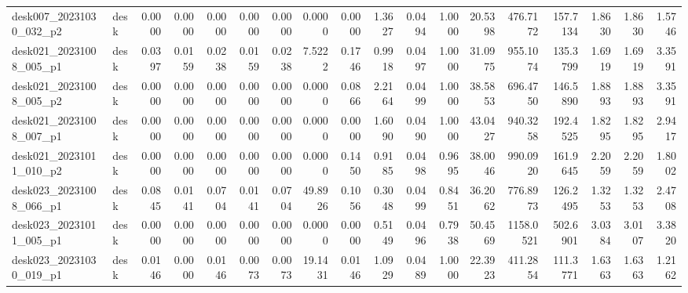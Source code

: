 \begin{table}[t]
{\begin{tabular}{l l r r r r r r r r r r r r r r r r }
desk007\_20231030\_032\_p2 & desk & 0.0000 & 0.0000 & 0.0000 & 0.0000 & 0.0000 & 0.0000 & 0.0000 & 1.3627 & 0.0494 & 1.0000 & 20.5398 & 476.7172 & 157.7134 & 1.8630 & 1.8630 & 1.5746 \\
desk021\_20231008\_005\_p1 & desk & 0.0397 & 0.0159 & 0.0238 & 0.0159 & 0.0238 & 7.5222 & 0.1746 & 0.9918 & 0.0497 & 1.0000 & 31.0975 & 955.1074 & 135.3799 & 1.6919 & 1.6919 & 3.3591 \\
desk021\_20231008\_005\_p2 & desk & 0.0000 & 0.0000 & 0.0000 & 0.0000 & 0.0000 & 0.0000 & 0.0866 & 2.2164 & 0.0499 & 1.0000 & 38.5853 & 696.4750 & 146.5890 & 1.8893 & 1.8893 & 3.3591 \\
desk021\_20231008\_007\_p1 & desk & 0.0000 & 0.0000 & 0.0000 & 0.0000 & 0.0000 & 0.0000 & 0.0000 & 1.6090 & 0.0490 & 1.0000 & 43.0427 & 940.3258 & 192.4525 & 1.8295 & 1.8295 & 2.9417 \\
desk021\_20231011\_010\_p2 & desk & 0.0000 & 0.0000 & 0.0000 & 0.0000 & 0.0000 & 0.0000 & 0.1450 & 0.9185 & 0.0498 & 0.9695 & 38.0046 & 990.0920 & 161.9645 & 2.2059 & 2.2059 & 1.8002 \\
desk023\_20231008\_066\_p1 & desk & 0.0845 & 0.0141 & 0.0704 & 0.0141 & 0.0704 & 49.8926 & 0.1056 & 0.3048 & 0.0499 & 0.8451 & 36.2062 & 776.8973 & 126.2495 & 1.3253 & 1.3253 & 2.4708 \\
desk023\_20231011\_005\_p1 & desk & 0.0000 & 0.0000 & 0.0000 & 0.0000 & 0.0000 & 0.0000 & 0.0000 & 0.5149 & 0.0496 & 0.7938 & 50.4569 & 1158.0521 & 502.6901 & 3.0384 & 3.0107 & 3.3820 \\
desk023\_20231030\_019\_p1 & desk & 0.0146 & 0.0000 & 0.0146 & 0.0073 & 0.0073 & 19.1431 & 0.0146 & 1.0929 & 0.0489 & 1.0000 & 22.3923 & 411.2854 & 111.3771 & 1.6363 & 1.6363 & 1.2162 \\
\bottomrule
\end{tabular}}
\end{table}
